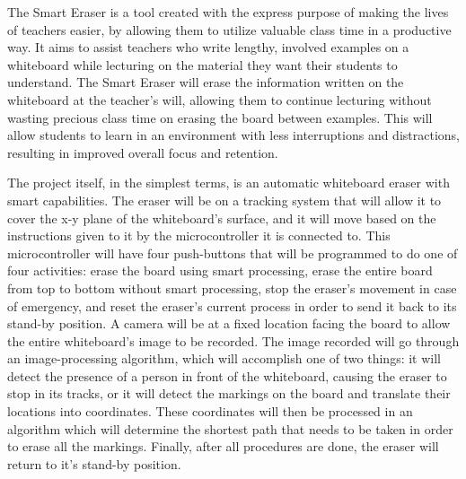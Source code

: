  The Smart Eraser is a tool created with the express purpose of making the lives of teachers easier, by allowing them to utilize valuable class time in a productive way. It aims to assist teachers who write lengthy, involved examples on a whiteboard while lecturing on the material they want their students to understand. The Smart Eraser will erase the information written on the whiteboard at the teacher's will, allowing them to continue lecturing without wasting precious class time on erasing the board between examples. This will allow students to learn in an environment with less interruptions and distractions, resulting in improved overall focus and retention. \par
 \setlength{\parindent}{2.5ex} The project itself, in the simplest terms, is an automatic whiteboard eraser with smart capabilities. The eraser will be on a tracking system that will allow it to cover the x-y plane of the whiteboard's surface, and it will move based on the instructions given to it by the microcontroller it is connected to. This microcontroller will have four push-buttons that will be programmed to do one of four activities: erase the board using smart processing, erase the entire board from top to bottom without smart processing, stop the eraser's movement in case of emergency, and reset the eraser's current process in order to send it back to its stand-by position. A camera will be at a fixed location facing the board to allow the entire whiteboard's image to be recorded. The image recorded will go through an image-processing algorithm, which will accomplish one of two things: it will detect the presence of a person in front of the whiteboard, causing the eraser to stop in its tracks, or it will detect the markings on the board and translate their locations into coordinates. These coordinates will then be processed in an algorithm which will determine the shortest path that needs to be taken in order to erase all the markings. Finally, after all procedures are done, the eraser will return to it's stand-by position.

 \newpage
 \thispagestyle{empty}
 \tableofcontents
 \listoffigures
 \thispagestyle{empty}
 \listoftables
 
 \newpage
\setcounter{page}{1}
